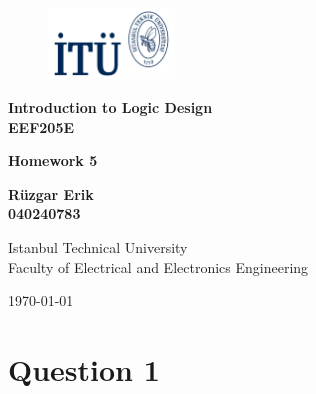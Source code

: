\documentclass[table ]{article}
\def\mytitle{Homework 5}
\begin{document}
    \begin{titlepage}
        \begin{figure}[h] %
            \begin{flushright}
            \includegraphics[width=0.3\textwidth]{logo_laci.png} %
                
            \end{flushright}
            \hfill
        \end{figure}

        \centering
        \vspace*{1in}
        
        \Huge
        \textbf{Introduction to Logic Design} \\
        \textbf{EEF205E} \\

        \vspace{0.5in}

        \Large
        \textbf{\mytitle} \\
        
        \vspace{0.5in}

        \large
        \textbf{Rüzgar Erik} \\
        \textbf{040240783} \\

        \vspace{0.5in}
        
        \Large
        Istanbul Technical University \\
        Faculty of Electrical and Electronics Engineering \\

        \vspace{0.25in}

        \today

        \vfill


    \end{titlepage}


    \section*{Question 1}
\end{document}

